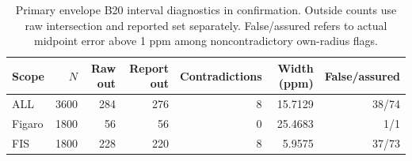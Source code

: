 \begin{table}[H]\centering\small
\caption{Primary envelope B20 interval diagnostics in confirmation. Outside counts use raw intersection and reported set separately. False/assured refers to actual midpoint error above 1 ppm among noncontradictory own-radius flags.}\label{tab:c5intervals}
\setlength{\tabcolsep}{4pt}\begin{tabular}{lrrrrrr}
\toprule
Scope & $N$ & Raw out & Report out & Contradictions & Width (ppm) & False/assured \\ \midrule
ALL & 3600 & 284 & 276 & 8 & 15.7129 & 38/74 \\
Figaro & 1800 & 56 & 56 & 0 & 25.4683 & 1/1 \\
FIS & 1800 & 228 & 220 & 8 & 5.9575 & 37/73 \\
\bottomrule\end{tabular}\end{table}
